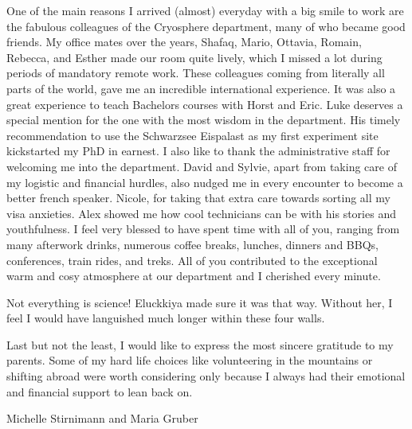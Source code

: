 One of the main reasons I arrived (almost) everyday with a big smile to work are the fabulous colleagues of the
Cryosphere department, many of who became good friends. My office mates over the years, Shafaq, Mario, Ottavia,
Romain, Rebecca, and Esther made our room quite lively, which I missed a lot during periods of mandatory remote
work. These colleagues coming from literally all parts of the world, gave me an incredible international
experience. It was also a great experience to teach Bachelors courses with Horst and Eric. Luke deserves a
special mention for the one with the most wisdom in the department. His timely recommendation to use the
Schwarzsee Eispalast as my first experiment site kickstarted my PhD in earnest. I also like to thank the
administrative staff for welcoming me into the department. David and Sylvie, apart from taking care of my
logistic and financial hurdles, also nudged me in every encounter to become a better french speaker. Nicole, for
taking that extra care towards sorting all my visa anxieties. Alex showed me how cool technicians can be with
his stories and youthfulness. I feel very blessed to have spent time with all of you, ranging from many
afterwork drinks, numerous coffee breaks, lunches, dinners and BBQs, conferences, train rides, and treks. All of
you contributed to the exceptional warm and cosy atmosphere at our department and I cherished every minute. 

Not everything is science! Eluckkiya made sure it was that way. Without her, I feel I would have languished much
longer within these four walls.

Last but not the least, I would like to express the most sincere gratitude to my parents. Some of my hard life
choices like volunteering in the mountains or shifting abroad were worth considering only because I always had
their emotional and financial support to lean back on.

Michelle Stirnimann and Maria Gruber

